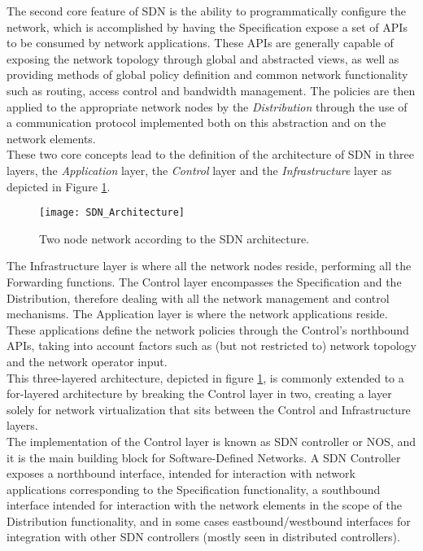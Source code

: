 %
The second core feature of \gls{SDN} is the ability to programmatically configure the network, which is accomplished by having the Specification expose a set of \glspl{API} to be consumed by network applications.
These \glspl{API} are generally capable of exposing the network topology through global and abstracted views, as well as providing methods of global policy definition and common network functionality such as routing, access control and bandwidth management\cite{OFWP}.
The policies are then applied to the appropriate network nodes by the \emph{Distribution} through the use of a communication protocol implemented both on this abstraction and on the network elements.\\
%
These two core concepts lead to the definition of the architecture of \gls{SDN} in three layers, the \emph{Application} layer, the \emph{Control} layer and the \emph{Infrastructure} layer \cite{OpenNetworkingFoundation}\cite{Kreutz2014} as depicted in Figure \ref{fig:SDN_Architecture}.
\begin{figure}
	\centering
	\texttt{[image: SDN\_Architecture]}
	\caption{Two node network according to the SDN architecture.}
	\label{fig:SDN_Architecture}
\end{figure}
The Infrastructure layer is where all the network nodes reside, performing all the Forwarding functions.
The Control layer encompasses the Specification and the Distribution, therefore dealing with all the network management and control mechanisms.
The Application layer is where the network applications reside.
These applications define the network policies through the Control's northbound \glspl{API}, taking into account factors such as (but not restricted to) network topology and the network operator input.\\
This three-layered architecture, depicted in figure \ref{fig:SDN_Architecture}, is commonly extended to a for-layered architecture by breaking the Control layer in two, creating a layer solely for network virtualization that sits between the Control and Infrastructure layers.\\
%
The implementation of the Control layer is known as \gls{SDN} controller or \gls{NOS}, and it is the main building block for Software-Defined Networks.
A \gls{SDN} Controller exposes a northbound interface, intended for interaction with network applications corresponding to the Specification functionality, a southbound interface intended for interaction with the network elements in the scope of the Distribution functionality, and in some cases eastbound/westbound interfaces for integration with other \gls{SDN} controllers (mostly seen in distributed controllers)\cite{Kreutz2014}.
